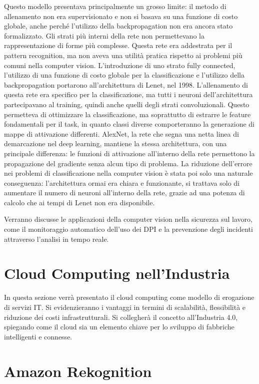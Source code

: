 Questo modello presentava principalmente un grosso limite: il metodo di allenamento non era supervisionato e non si basava su una funzione di costo globale, anche perché l'utilizzo della backpropagation non era ancora stato formalizzato. Gli strati più interni della rete non permettevano la rappresentazione di forme più complesse. Questa rete era addestrata per il pattern recognition, ma non aveva una utilità pratica rispetto ai problemi più comuni nella computer vision. L'introduzione di uno strato fully connected, l'utilizzo di una funzione di costo globale per la classificazione e l'utilizzo della backpropagation portarono all'architettura di Lenet, nel 1998. L'allenamento di questa rete era specifico per la classificazione, ma tutti i neuroni dell'architettura partecipavano al training, quindi anche quelli degli strati convoluzionali. Questo permetteva di ottimizzare la classificazione, ma soprattutto di estrarre le feature fondamentali per il task, in quanto classi diverse comporteranno la generazione di mappe di attivazione differenti. AlexNet, la rete che segna una netta linea di demarcazione nel deep learning, mantiene la stessa architettura, con una principale differenza: le funzioni di attivazione all'interno della rete permettono la propagazione del gradiente senza alcun tipo di problema. La riduzione dell'errore nei problemi di classificazione nella computer vision è stata poi solo una naturale conseguenza: l'architettura ormai era chiara e funzionante, si trattava solo di aumentare il numero di neuroni all'interno della rete, grazie ad una potenza di calcolo che ai tempi di Lenet non era disponibile.  
   

Verranno discusse le applicazioni della computer vision nella sicurezza sul lavoro, come il monitoraggio automatico dell'uso dei DPI e la prevenzione degli incidenti attraverso l'analisi in tempo reale.

\section{Cloud Computing nell'Industria}

In questa sezione verrà presentato il cloud computing come modello di erogazione di servizi IT. Si evidenzieranno i vantaggi in termini di scalabilità, flessibilità e riduzione dei costi infrastrutturali. Si collegherà il concetto all'Industria 4.0, spiegando come il cloud sia un elemento chiave per lo sviluppo di fabbriche intelligenti e connesse.

\section{Amazon Rekognition}

